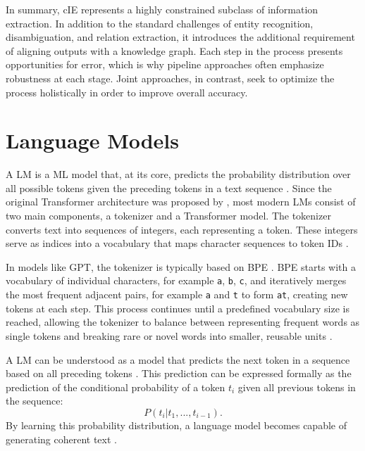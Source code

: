\documentclass[a4paper,oneside,bibliography=totoc]{scrbook}
\begin{document}
In summary, \ac{cIE} represents a highly constrained subclass of information extraction. In addition to the standard challenges of entity recognition, disambiguation, and relation extraction, it introduces the additional requirement of aligning outputs with a knowledge graph. Each step in the process presents opportunities for error, which is why pipeline approaches often emphasize robustness at each stage. Joint approaches, in contrast, seek to optimize the process holistically in order to improve overall accuracy.

\section{Language Models}
\label{sec:language_models}

A \ac{LM} is a \ac{ML} model that, at its core, predicts the probability distribution over all possible tokens given the preceding tokens in a text sequence \cite{Radford2019}. Since the original Transformer architecture was proposed by \citet{Vaswani2023}, most modern \acp{LM} consist of two main components, a tokenizer and a Transformer model. The tokenizer converts text into sequences of integers, each representing a token. These integers serve as indices into a vocabulary that maps character sequences to token IDs \cite{Sennrich2016}.

In models like GPT, the tokenizer is typically based on \ac{BPE} \cite{Radford2019}. \Ac{BPE} starts with a vocabulary of individual characters, for example \texttt{a}, \texttt{b}, \texttt{c}, and iteratively merges the most frequent adjacent pairs, for example \texttt{a} and \texttt{t} to form \texttt{at}, creating new tokens at each step. This process continues until a predefined vocabulary size is reached, allowing the tokenizer to balance between representing frequent words as single tokens and breaking rare or novel words into smaller, reusable units \cite{Sennrich2016}.

A \ac{LM} can be understood as a model that predicts the next token in a sequence based on all preceding tokens \cite{Radford2019}. This prediction can be expressed formally as the prediction of the conditional probability of a token $t_i$ given all previous tokens in the sequence:
\begin{equation}
  P(t_i|t_1, ..., t_{i-1}).
\end{equation}
By learning this probability distribution, a language model becomes capable of generating coherent text \cite{Radford2019,Brown2020}.
\end{document}
